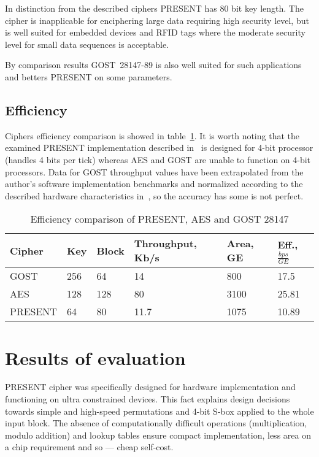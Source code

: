 In distinction from the described ciphers PRESENT has 80 bit key length.
The cipher is inapplicable for enciphering large data requiring high security level, but is
well suited for embedded devices and RFID tags where the moderate security level
for small data sequences is acceptable.

By comparison results GOST~28147-89 is also well suited for such
applications and betters PRESENT on some parameters.

\subsection{Efficiency}

Ciphers efficiency comparison is showed in table~\ref{tbl:comparison}. It is
worth noting that the examined PRESENT implementation described in~\cite{cryptoeprint:2009_516} is designed for
4-bit processor (handles 4 bits per tick) whereas AES and GOST are
unable to function on 4-bit processors. Data for GOST throughput values have
been extrapolated from the author's software implementation benchmarks and
normalized according to the described hardware characteristics
in~\cite{cryptoeprint:2009_516}, so the accuracy has some is not perfect.
\begin{table}[htbp]
    \centering
    \caption{Efficiency comparison of PRESENT, AES and GOST 28147}
    \label{tbl:comparison}
    \begin{tabular}{|l|p{1.5cm}|p{2cm}|p{2.8cm}|p{2.5cm}|p{2cm}|}
        \hline
        Cipher & Key & Block & Throughput, Kb/s & Area, GE & Eff., $\frac{bps}{GE}$ \\
        \hline
        GOST    & 256 & 64  & 14   & 800  & 17.5  \\
        \hline
        AES     & 128 & 128 & 80   & 3100 & 25.81 \\
        \hline
        PRESENT & 64  & 80  & 11.7 & 1075 & 10.89 \\
        \hline
    \end{tabular}
\end{table}

\section{Results of evaluation}

PRESENT cipher was specifically designed for hardware implementation
and functioning on ultra constrained devices. This fact explains design
decisions towards simple and high-speed permutations and 4-bit S-box applied to
the whole input block. The absence of computationally difficult operations
(multiplication, modulo addition) and lookup tables ensure compact
implementation, less area on a chip requirement and so --- cheap self-cost.

